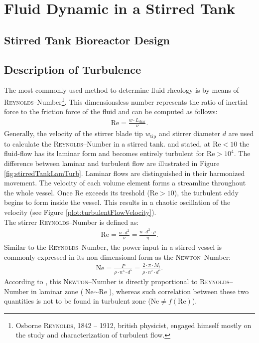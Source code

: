 \section{Fluid Dynamic in a Stirred Tank}
\subsection{Stirred Tank Bioreactor Design}

\subsection{Description of Turbulence}
The most commonly used method to determine fluid rheology is by means of \textsc{Reynolds}--Number\footnote{Osborne \textsc{Reynolds}, 1842 -- 1912, british physicist, engaged himself mostly on the study and characterization of turbulent flow.}. This dimensionsless number represents the ratio of inertial force to the friction force of the fluid and can be computed as follows:
\begin{align} \label{eq:reynoldGeneral}
    \text{Re} = \frac{w \cdot L_{\text{char}}}{\nu}.
\end{align}
Generally, the velocity of the stirrer blade tip $w_{\text{tip}}$ and stirrer diameter $d$ are used to calculate the \textsc{Reynolds}--Number in a stirred tank. \citet{Kraume2012} and \citet{Wollny2010Diss} stated, at $\text{Re} < 10$ the fluid-flow has its laminar form and becomes entirely turbulent for $\text{Re} > 10^4$. The difference between laminar and turbulent flow are illustrated in Figure \ref{fig:stirredTankLamTurb}. Laminar flows are distinguished in their harmonized movement. The velocity of each volume element forms a streamline throughout the whole vessel. Once Re exceeds its treshold ($\text{Re} > 10$), the turbulent eddy begins to form inside the vessel. This results in a chaotic oscillation of the velocity (see Figure \ref{plot:turbulentFlowVelocity}).
\\
The stirrer \textsc{Reynolds}--Number is defined as:
\begin{gather}
    \text{Re} = \frac{n \cdot d^2}{\nu} = \frac{n \cdot d^2 \cdot \rho}{\eta}.
\end{gather}
Similar to the \textsc{Reynolds}--Number, the power input in a stirred vessel is commonly expressed in its non-dimensional form as the \textsc{Newton}--Number:
\begin{gather}
    \text{Ne} = \frac{P}{\rho \cdot n^3 \cdot d^5} = \frac{2 \cdot \pi \cdot M_t}{\rho \cdot n^2 \cdot d^5}.
\end{gather}
According to \citet{Wollny2010Diss}, this \textsc{Newton}--Number is directly proportional to \textsc{Reynolds}--Number in laminar zone ($\text{Ne} \sim \text{Re}$), whereas such correlation between these two quantities is not to be found in turbulent zone ($\text{Ne} \neq f(\text{Re})$). 

